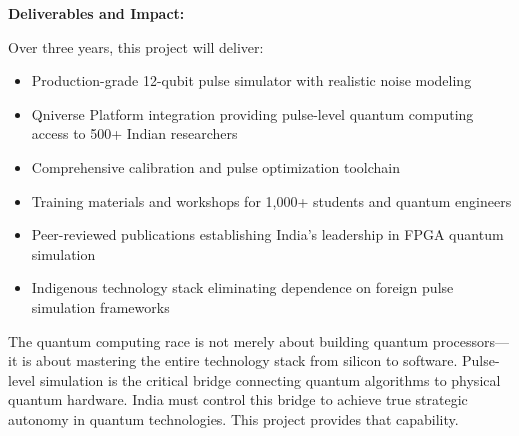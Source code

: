 \documentclass[12pt,a4paper]{article}
\begin{document}
\textbf{Deliverables and Impact:}

Over three years, this project will deliver:

\begin{itemize}[noitemsep]
\item Production-grade 12-qubit pulse simulator with realistic noise modeling
\item Qniverse Platform integration providing pulse-level quantum computing access to 500+ Indian researchers
\item Comprehensive calibration and pulse optimization toolchain
\item Training materials and workshops for 1,000+ students and quantum engineers
\item Peer-reviewed publications establishing India's leadership in FPGA quantum simulation
\item Indigenous technology stack eliminating dependence on foreign pulse simulation frameworks
\end{itemize}

The quantum computing race is not merely about building quantum processors—it is about mastering the entire technology stack from silicon to software. Pulse-level simulation is the critical bridge connecting quantum algorithms to physical quantum hardware. India must control this bridge to achieve true strategic autonomy in quantum technologies. This project provides that capability.
\end{document}
